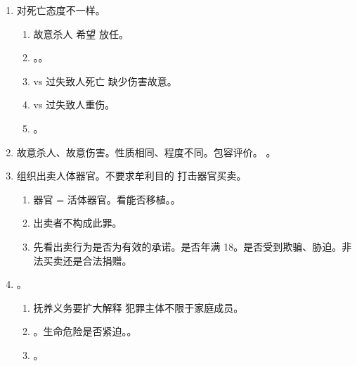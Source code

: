 \begin{enumerate}
\begin{enumerate}
                \begin{enumerate}
                  \item 客观上行为要有造成轻伤的一般可能性。
                  \item 主观上要有造成轻伤的意图。
                \end{enumerate}
          \item 伤害结果有程度要求。
                \begin{enumerate}
                  \item 轻微伤（刑法不管）、轻伤、重伤、伤害致死。
                        。
                  \item 一般是身体伤害，精神伤害具体分析。。
                \end{enumerate}
          \item 致人轻伤。 岁。
          \item {}。 岁。
        \end{enumerate}
  \item \sjt 对死亡态度不一样。
        \begin{enumerate}
          \item 故意杀人 \yjt 希望 \hz 放任。
          \item {}。。
          \item vs 过失致人死亡 \yjt 缺少伤害故意。
          \item vs 过失致人重伤。
          \item {}。
        \end{enumerate}
  \item 故意杀人、故意伤害。性质相同、程度不同。包容评价。
        。
  \item 组织出卖人体器官。不要求牟利目的 \yjt 打击器官买卖。
        \begin{enumerate}
          \item 器官 = 活体器官。看能否移植。。
          \item 出卖者不构成此罪。
          \item 先看出卖行为是否为有效的承诺。\yi 是否年满 18。\er 是否受到欺骗、胁迫。\san 非法买卖还是合法捐赠。
        \end{enumerate}
  \item {}。
        \begin{enumerate}
          \item 抚养义务要扩大解释 \yjt 犯罪主体不限于家庭成员。
          \item {}。生命危险是否紧迫。。
          \item {}。
        \end{enumerate}
\end{enumerate}
